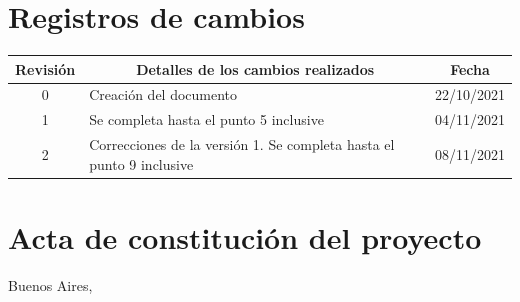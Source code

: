 \documentclass[
11pt, %
]{charter}
\begin{document}
\maketitle
\thispagestyle{empty}
\pagebreak


\thispagestyle{empty}
{\setlength{\parskip}{0pt}
\tableofcontents{}
}
\pagebreak


\section*{Registros de cambios}
\label{sec:registro}


\begin{table}[ht]
\label{tab:registro}
\centering
\begin{tabularx}{\linewidth}{@{}|c|X|c|@{}}
\hline
\rowcolor[HTML]{C0C0C0} 
Revisión & \multicolumn{1}{c|}{\cellcolor[HTML]{C0C0C0}Detalles de los cambios realizados} & Fecha      \\ \hline
0      & Creación del documento                                 				& 22/10/2021 \\ \hline
1      & Se completa hasta el punto 5 inclusive                 				& 04/11/2021 \\ \hline
2      & Correcciones de la versión 1. Se completa hasta el punto 9 inclusive	& 08/11/2021 \\ \hline
\end{tabularx}
\end{table}

\pagebreak



\section*{Acta de constitución del proyecto}
\label{sec:acta}

\begin{flushright}
Buenos Aires, \fechaInicioName
\end{flushright}
\end{document}
